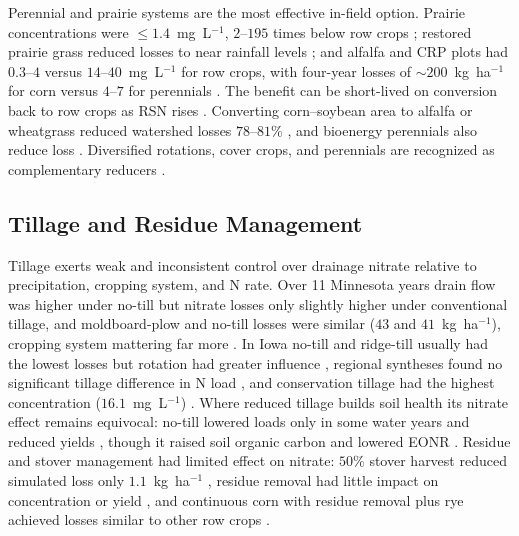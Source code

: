 Perennial and prairie systems are the most effective in-field option. Prairie
concentrations were $\le1.4$~mg~L$^{-1}$, $2$--$195$ times below row crops
\parencite{Daigh2015b}; restored prairie grass reduced losses to near rainfall
levels \parencite{HernandezRamirez2011}; and alfalfa and CRP plots had
$0.3$--$4$ versus $14$--$40$~mg~L$^{-1}$ for row crops, with four-year losses
of $\sim200$~kg~ha$^{-1}$ for corn versus $4$--$7$ for perennials
\parencite{Randall2001,Waring2024}. The benefit can be short-lived on
conversion back to row crops as RSN rises \parencite{Huggins2001}. Converting
corn--soybean area to alfalfa or wheatgrass reduced watershed losses
$78$--$81\%$ \parencite{Wilson2023}, and bioenergy perennials also reduce
loss \parencite{Ferin2023,Woodbury2018,Guo2018}. Diversified rotations, cover
crops, and perennials are recognized as complementary reducers
\parencite{Dinnes2002}.

\subsection{Tillage and Residue Management}

Tillage exerts weak and inconsistent control over drainage nitrate relative to
precipitation, cropping system, and N rate. Over 11 Minnesota years drain flow
was higher under no-till but nitrate losses only slightly higher under
conventional tillage, and moldboard-plow and no-till losses were similar
($43$ and $41$~kg~ha$^{-1}$), cropping system mattering far more
\parencite{RANDALL1995,Randall2001}. In Iowa no-till and ridge-till usually
had the lowest losses but rotation had greater influence
\parencite{Weed1996,Kanwar1997}, regional syntheses found no significant
tillage difference in N load \parencite{Zhao2016}, and conservation tillage
had the highest concentration ($16.1$~mg~L$^{-1}$) \parencite{Hertzberger2019,Wang2016b}.
Where reduced tillage builds soil health its nitrate effect remains equivocal:
no-till lowered loads only in some water years and reduced yields
\parencite{Masri2024}, though it raised soil organic carbon and lowered EONR
\parencite{Cassman2025,Waring2024}. Residue and stover management had limited
effect on nitrate: $50\%$ stover harvest reduced simulated loss only
$1.1$~kg~ha$^{-1}$ \parencite{Malone2019}, residue removal had little impact on
concentration or yield \parencite{Dougherty2020,Guo2018}, and continuous corn
with residue removal plus rye achieved losses similar to other row crops
\parencite{Daigh2015b,Farahani2020}.

